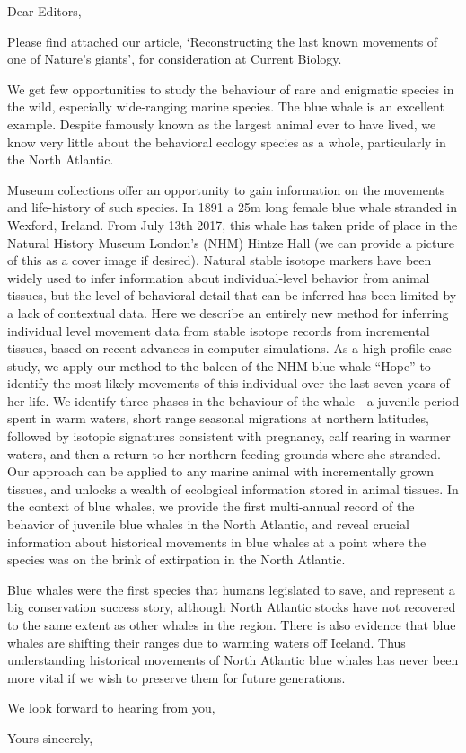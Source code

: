 \documentclass[11pt]{letter}
\begin{document}
\begin{letter}{}
\opening{Dear Editors,}

Please find attached our article, `Reconstructing the last known movements of one of Nature's giants', for consideration at Current Biology.

We get few opportunities to study the behaviour of rare and enigmatic species in the wild, especially wide-ranging marine species. 
The blue whale is an excellent example. 
Despite famously known as the largest animal ever to have lived, we know very little about the behavioral ecology species as a whole, particularly in the North Atlantic.

Museum collections offer an opportunity to gain information on the movements and life-history of such species. 
In 1891 a 25m long female blue whale stranded in Wexford, Ireland. 
From July 13th 2017, this whale has taken pride of place in the Natural History Museum London's (NHM) Hintze Hall (we can provide a picture of this as a cover image if desired).
Natural stable isotope markers have been widely used to infer information about individual-level behavior from animal tissues, but the level of behavioral detail that can be inferred has been limited by a lack of contextual data. 
Here we describe an entirely new method for inferring individual level movement data from stable isotope records from incremental tissues, based on recent advances in computer simulations. 
As a high profile case study, we apply our method to the baleen of the NHM blue whale ``Hope'' to identify the most likely movements of this individual over the last seven years of her life. 
We identify three phases in the behaviour of the whale - a juvenile period spent in warm waters, short range seasonal migrations at northern latitudes, followed by isotopic signatures consistent with pregnancy, calf rearing in warmer waters, and then a return to her northern feeding grounds where she stranded. 
Our approach can be applied to any marine animal with incrementally grown tissues, and unlocks a wealth of ecological information stored in animal tissues. 
In the context of blue whales, we provide the first multi-annual record of the behavior of juvenile blue whales in the North Atlantic, and reveal crucial information about historical movements in blue whales at a point where the species was on the brink of extirpation in the North Atlantic.

Blue whales were the first species that humans legislated to save, and represent a big conservation success story, although North Atlantic stocks have not recovered to the same extent as other whales in the region. 
There is also evidence that blue whales are shifting their ranges due to warming waters off Iceland. 
Thus understanding historical movements of North Atlantic blue whales has never been more vital if we wish to preserve them for future generations.
 
We look forward to hearing from you,


\closing{Yours sincerely,}


\end{letter}
\end{document}
